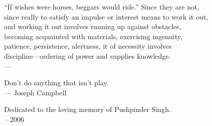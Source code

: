 \thispagestyle{empty}
{}

\vspace*{3cm}

\begin{center}
``If wishes were horses, beggars would ride.''  Since they are not, \\ \medskip
since really to satisfy an impulse or interest means to work it out, \\ \medskip
and working it out involves running up against obstacles, \\ \medskip
becoming acquainted with materials, exercising ingenuity, \\ \medskip
patience, persistence, alertness, it of necessity involves \\ \medskip
discipline---ordering of power and supplies knowledge. \\ \medskip
    --- 
\end{center}

\medskip

\begin{center}
Don't do anything that isn't play. \\ \medskip
    --- Joseph Campbell
\end{center}

\medskip

\begin{center}
    Dedicated to the loving memory of Pushpinder Singh. \\ \,--\,2006
\end{center}
